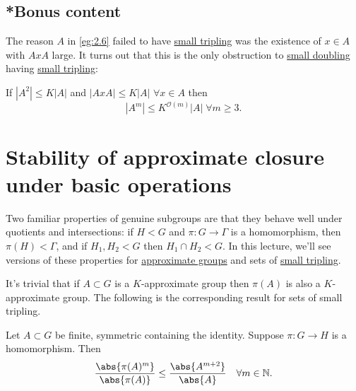 \documentclass{article}
\newcommand{\ratio}[2]{\frac{\abs{#1}}{\abs{#2}}}
\numberwithin{equation}{section}
\begin{document}
\color{gray}
\subsection*{*Bonus content}
The reason $A$ in \cref{eg:2.6} failed to have \hyperlink{def:tripling}{small tripling} was the existence of $x \in A$ with $A x A$ large.
It turns out that this is the only obstruction to \hyperlink{def:doubling}{small doubling} having \hyperlink{def:tripling}{small tripling}:
\begin{thm}\label{thm:3.5}
  If $|A^2| \leq K|A|$ and $|AxA| \leq K|A|$ $\forall x \in A$ then
  \begin{equation*}|A^m| \leq K^{\mathcal{O}(m)} |A| \; \forall m \geq 3.\end{equation*}
\end{thm}
\color{black}

\clearpage
\section{Stability of approximate closure under basic operations}
Two familiar properties of genuine subgroups are that they behave well under quotients and intersections:
if $H < G$ and $\pi: G \to \Gamma$ is a homomorphism, then $\pi(H) < \Gamma$, and if $H_1, H_2 < G$ then $H_1 \cap H_2 < G$.
In this lecture, we'll see versions of these properties for \hyperlink{def:appGroup}{approximate groups} and sets of \hyperlink{def:tripling}{small tripling}.

It's trivial that if $A \subset G$ is a $K$-approximate group then $\pi(A)$ is also a $K$-approximate group.
The following is the corresponding result for sets of small tripling.
\begin{nlemma}\label{lem:4.1}
  Let $A \subset G$ be finite, symmetric containing the identity. Suppose $\pi: G \to H$ is a homomorphism. Then
  \begin{equation*}
    \ratio{\pi(A)^m}{\pi(A)} \leq \ratio{A^{m+2}}{A} \quad \forall m \in \mathbb{N}.
  \end{equation*}
\end{nlemma}
\end{document}

